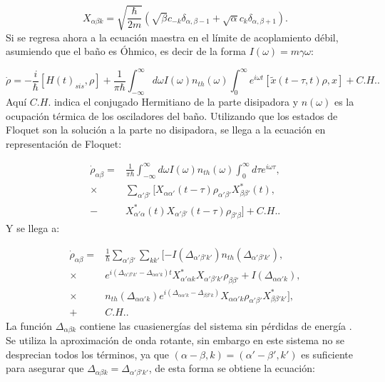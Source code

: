 \documentclass[a4paper,10pt]{report}
\begin{document}
\begin{equation}
X_{\alpha\beta k} = \sqrt{\frac{\hbar}{2m}}(\sqrt{\beta}c_{-k} \delta_{\alpha,\beta-1}+\sqrt{\alpha}c_k\delta_{\alpha,\beta+1}).
\end{equation} Si se regresa ahora a la ecuación maestra en el límite de acoplamiento débil, asumiendo que el baño es Óhmico, es decir de la forma $I(\omega) = m\gamma \omega$:

\begin{equation}
\dot{\rho} = -\frac{i}{\hbar}[H(t)_{sis},\rho] + \frac{1}{\pi \hbar} \int_{-\infty}^\infty d\omega I(\omega)n_{th}(\omega)\int_0^\infty e^{i\omega t}[\tilde{x}(t-\tau,t)\rho,x] + C.H..
\end{equation}Aquí $C.H.$ indica el conjugado Hermitiano de la parte disipadora y $n(\omega)$ es la ocupación térmica de los osciladores del baño. Utilizando que los estados de Floquet son la solución a la parte no disipadora, se llega a la ecuación en representación de Floquet:

\begin{align*}
\dot{\rho}_{\alpha \beta} =& \frac{1}{\pi \hbar} \int_{-\infty}^\infty d\omega I(\omega)n_{th}(\omega) \int_0 ^{\infty} d\tau e^{i\omega \tau}, \\
 \times & \sum_{\alpha' \beta '} [X_{\alpha \alpha'}(t-\tau)\rho_{\alpha' \beta'}X^* _{\beta \beta'}(t),\\
 -& X^* _{\alpha' \alpha}(t) X_{\alpha' \beta'}(t-\tau)\rho_{\beta' \beta}] + C.H..
\end{align*} Y se llega a:

\begin{align*}
\dot{\rho}_{\alpha \beta} =& \frac{1}{\hbar} \sum_{\alpha' \beta'}\sum_{k k'}[-I(\Delta_{\alpha' \beta' k'}) n_{th} (\Delta_{\alpha' \beta' k'}),\\
\times & e^{i(\Delta_{\alpha' \beta' k'}-\Delta_{\alpha \alpha' k})t} X^*_{\alpha' \alpha k}X_{\alpha' \beta' k'}\rho_{\beta \beta'} + I(\Delta_{\alpha \alpha' k}),\\
\times & n_{th}(\Delta_{\alpha \alpha' k}) e^{i(\Delta_{\alpha \alpha' k}-\Delta_{\beta \beta' k})}X_{\alpha \alpha' k} \rho_{\alpha' \beta'}X^*_{\beta \beta' k'}],\\
+& C. H..  
\end{align*} La función $\Delta_{\alpha \beta k}$ contiene las cuasienergías del sistema sin pérdidas de energía \cite{HanngiDQS}. Se utiliza la aproximación de onda rotante, sin embargo en este sistema no se desprecian todos los términos, ya que $(\alpha-\beta,k)=(\alpha'-\beta',k')$ es suficiente para asegurar que $\Delta_{\alpha \beta k}=\Delta_{\alpha' \beta' k'}$, de esta forma se obtiene la ecuación:
\end{document}
